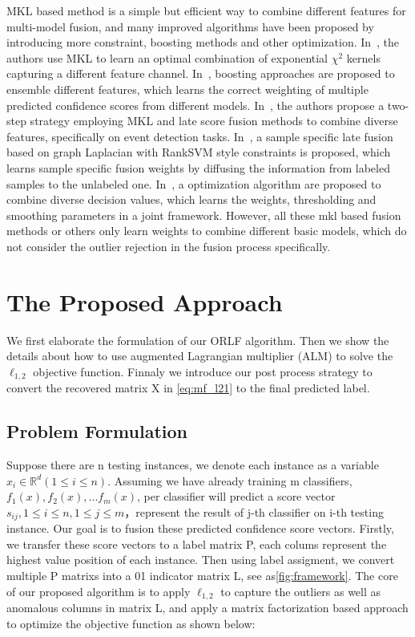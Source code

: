 \documentclass[letterpaper]{article}
\def\dsR{\mathds{R}}
\begin{document}
MKL based method is a simple but efficient way to combine different features for multi-model fusion,
and many improved algorithms have been proposed by introducing more constraint, boosting methods and other optimization.
In~\cite{vedaldi2009multiple}, the authors use MKL to learn an optimal combination of exponential ${\chi}^2$ kernels capturing a different feature channel. 
In~\cite{gehler2009feature}, boosting approaches are proposed to ensemble different features, which learns the correct weighting of multiple predicted confidence scores from different models.
In~\cite{natarajan2012multimodal}, the authors propose a two-step strategy employing MKL and late score fusion methods to combine diverse features, specifically on event detection tasks.
In~\cite{lai2015learning}, a sample specific late fusion based on graph Laplacian with RankSVM style constraints is proposed,
which learns sample specific fusion weights by diffusing the information from labeled samples to the unlabeled one.
In~\cite{xuiccv2013feature}, a optimization algorithm are proposed to combine diverse decision values, 
which learns the weights, thresholding and smoothing parameters in a joint framework.
However, all these mkl based fusion methods or others only learn weights to combine different basic models, which do not consider the outlier rejection in the fusion process specifically.


\section{The Proposed Approach}
We first elaborate the formulation of our ORLF algorithm. Then we show the details about how to use augmented Lagrangian multiplier (ALM) to solve the $\ell_{1,2}$ objective function. Finnaly we introduce our post process strategy to convert the recovered matrix X in \ref{eq:mf_l21} to the final predicted label.


\subsection{Problem Formulation}
Suppose there are n testing instances, we denote each instance as a variable $x_i{\in}\dsR^{d}(1{\leq}i{\leq}n)$. Assuming we have already training m classifiers, $f_1(x), f_2(x), ... f_m(x)$, per classifier will predict a score vector $s_{ij}, 1{\leq}i{\leq}n, 1{\leq}j{\leq}m $，represent the result of j-th classifier on i-th testing instance. Our goal is to fusion these predicted confidence score vectors. Firstly, we transfer these score vectors to a label matrix P, each colums represent the highest value position of each instance. Then using label assigment, we convert multiple P matrixs into a 01 indicator matrix L, see as{\ref{fig:framework}}.
The core of our proposed algorithm is to apply $\ell_{1,2}$ to capture the outliers as well as anomalous columns in matrix L, and apply a matrix factorization based approach to optimize the objective function as shown below: 
\end{document}
